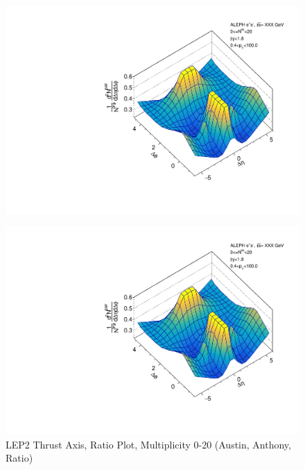 \begin{figure}[htbp]
  \caption{LEP2 Thrust Axis, Ratio Plot, Multiplicity 0-20 (Austin, Anthony, Ratio)}
  \begin{minipage}[b]{0.32\linewidth}
    \centering
    \includegraphics[width=\linewidth]{images/TwoParticleCorrelation/LEP2_THRUST/LEP2_THRUST_ratio1_0_20.pdf}
    \label{fig:LEP2 Thrust Axis, Ratio Plot, Multiplicity 0-20, Austin}
  \end{minipage}
  \hspace{0.0cm}
  \begin{minipage}[b]{0.32\linewidth}
    \centering
    \includegraphics[width=\linewidth]{images/TwoParticleCorrelation/LEP2_THRUST/LEP2_THRUST_ratio2_0_20.pdf}

\end{minipage}
\end{figure}
